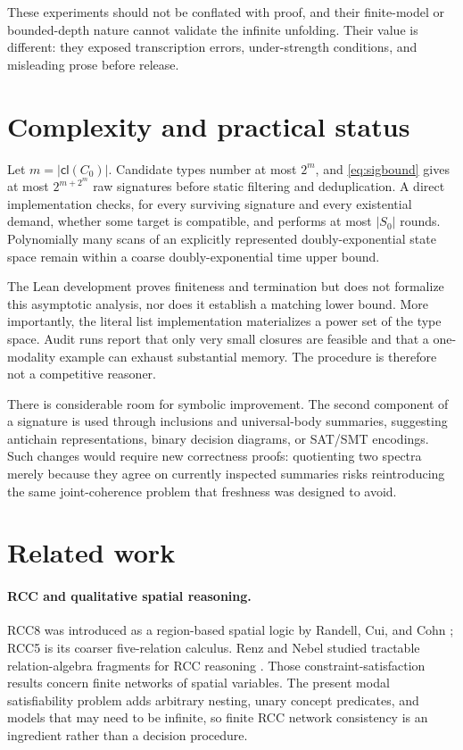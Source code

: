 \documentclass[11pt]{article}
\theoremstyle{plain}
\theoremstyle{definition}
\theoremstyle{remark}
\newcommand{\cl}{\ensuremath{\mathsf{cl}}}
\begin{document}
These experiments should not be conflated with proof, and their finite-model
or bounded-depth nature cannot validate the infinite unfolding.  Their value
is different: they exposed transcription errors, under-strength conditions,
and misleading prose before release.

\section{Complexity and practical status}
\label{sec:complexity}

Let $m=|\cl(C_0)|$.  Candidate types number at most $2^m$, and
\cref{eq:sigbound} gives at most $2^{m+2^m}$ raw signatures before static
filtering and deduplication.  A direct implementation checks, for every
surviving signature and every existential demand, whether some target is
compatible, and performs at most $|S_0|$ rounds.  Polynomially many scans of
an explicitly represented doubly-exponential state space remain within a
coarse doubly-exponential time upper bound.

The Lean development proves finiteness and termination but does not formalize
this asymptotic analysis, nor does it establish a matching lower bound.  More
importantly, the literal list implementation materializes a power set of the
type space.  Audit runs report that only very small closures are feasible and
that a one-modality example can exhaust substantial memory.  The procedure is
therefore not a competitive reasoner.

There is considerable room for symbolic improvement.  The second component of
a signature is used through inclusions and universal-body summaries, suggesting
antichain representations, binary decision diagrams, or SAT/SMT encodings.
Such changes would require new correctness proofs: quotienting two spectra
merely because they agree on currently inspected summaries risks reintroducing
the same joint-coherence problem that freshness was designed to avoid.

\section{Related work}
\label{sec:related}

\paragraph{RCC and qualitative spatial reasoning.}
RCC8 was introduced as a region-based spatial logic by Randell, Cui, and Cohn
\cite{RandellCuiCohn1992}; RCC5 is its coarser five-relation calculus.  Renz
and Nebel studied tractable relation-algebra fragments for RCC reasoning
\cite{RenzNebel1999}.  Those constraint-satisfaction results concern finite
networks of spatial variables.  The present modal satisfiability problem adds
arbitrary nesting, unary concept predicates, and models that may need to be
infinite, so finite RCC network consistency is an ingredient rather than a
decision procedure.
\end{document}
